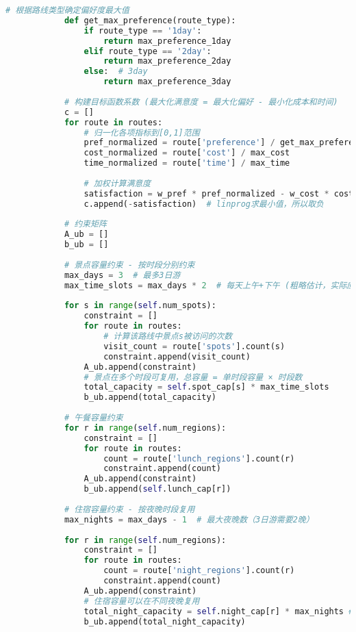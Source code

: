 \begin{lstlisting}[language=Python]
            # 根据路线类型确定偏好度最大值
            def get_max_preference(route_type):
                if route_type == '1day':
                    return max_preference_1day
                elif route_type == '2day':
                    return max_preference_2day
                else:  # 3day
                    return max_preference_3day
            
            # 构建目标函数系数 (最大化满意度 = 最大化偏好 - 最小化成本和时间)
            c = []
            for route in routes:
                # 归一化各项指标到[0,1]范围
                pref_normalized = route['preference'] / get_max_preference(route['type'])
                cost_normalized = route['cost'] / max_cost
                time_normalized = route['time'] / max_time
                
                # 加权计算满意度
                satisfaction = w_pref * pref_normalized - w_cost * cost_normalized - w_time * time_normalized
                c.append(-satisfaction)  # linprog求最小值，所以取负
            
            # 约束矩阵
            A_ub = []
            b_ub = []
            
            # 景点容量约束 - 按时段分别约束
            max_days = 3  # 最多3日游
            max_time_slots = max_days * 2  # 每天上午+下午 (粗略估计，实际应更精细，但为了简化模型，保持原逻辑)
            
            for s in range(self.num_spots):
                constraint = []
                for route in routes:
                    # 计算该路线中景点s被访问的次数
                    visit_count = route['spots'].count(s)
                    constraint.append(visit_count)
                A_ub.append(constraint)
                # 景点在多个时段可复用，总容量 = 单时段容量 × 时段数
                total_capacity = self.spot_cap[s] * max_time_slots
                b_ub.append(total_capacity)
            
            # 午餐容量约束
            for r in range(self.num_regions):
                constraint = []
                for route in routes:
                    count = route['lunch_regions'].count(r)
                    constraint.append(count)
                A_ub.append(constraint)
                b_ub.append(self.lunch_cap[r])
            
            # 住宿容量约束 - 按夜晚时段复用
            max_nights = max_days - 1  # 最大夜晚数（3日游需要2晚）
            
            for r in range(self.num_regions):
                constraint = []
                for route in routes:
                    count = route['night_regions'].count(r)
                    constraint.append(count)
                A_ub.append(constraint)
                # 住宿容量可以在不同夜晚复用
                total_night_capacity = self.night_cap[r] * max_nights # 使用 self.night_cap
                b_ub.append(total_night_capacity)
            

\end{lstlisting}
